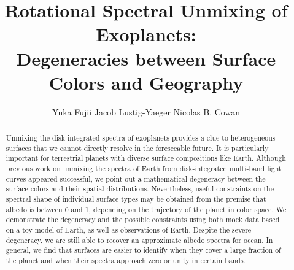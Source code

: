 \documentclass[iop,numberedappendix,apj]{emulateapj}
\begin{document}
\title{Rotational Spectral Unmixing of Exoplanets:\\Degeneracies between Surface Colors and Geography}


\author{
%
Yuka Fujii 
%
Jacob Lustig-Yaeger 
%
Nicolas B. Cowan 
%
}

      
  







\vspace{0.5\baselineskip}


\begin{abstract}

Unmixing the disk-integrated spectra of exoplanets provides a clue to heterogeneous surfaces that we cannot directly resolve in the foreseeable future. 
It is particularly important for terrestrial planets with diverse surface compositions like Earth. 
Although previous work on unmixing the spectra of Earth from disk-integrated multi-band light curves appeared successful, we point out a mathematical degeneracy between the surface colors and their spatial  distributions. 
Nevertheless, useful constraints on the spectral shape of individual surface types may be obtained from the premise that albedo is between 0 and 1, depending on the trajectory of the planet in color space.  
We demonstrate the degeneracy and the possible constraints using both mock data based on a toy model of Earth, as well as observations of Earth. 
Despite the severe degeneracy, we are still able to recover an approximate albedo spectra for ocean. 
In general, we find that surfaces are easier to identify when they cover a large fraction of the planet and when their spectra approach zero or unity in certain bands. 
\end{abstract}
\end{document}
